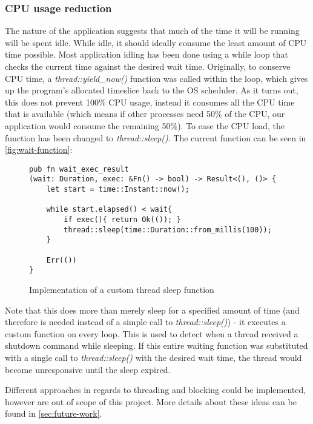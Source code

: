         \subsubsection{CPU usage reduction}
             The nature of the application suggests that much of the time it will be running will be spent idle. While idle, it should ideally consume the least amount of CPU time possible. Most application idling has been done using a while loop that checks the current time against the desired wait time. Originally, to conserve CPU time, a \textit{thread::yield\_now()} function was called within the loop, which gives up the program's allocated timeslice back to the OS scheduler. As it turns out, this does not prevent 100\% CPU usage, instead it consumes all the CPU time that is available (which means if other processes need 50\% of the CPU, our application would consume the remaining 50\%). To ease the CPU load, the function has been changed to \textit{thread::sleep()}. The current function can be seen in \autoref{fig:wait-function}:
             
             \begin{figure}[!htb]
                \centering
                \begin{BVerbatim}
pub fn wait_exec_result
(wait: Duration, exec: &Fn() -> bool) -> Result<(), ()> {
    let start = time::Instant::now();

    while start.elapsed() < wait{
        if exec(){ return Ok(()); }
        thread::sleep(time::Duration::from_millis(100));
    }
    
    Err(())
}
                \end{BVerbatim}
                \caption{Implementation of a custom thread sleep function}
                \label{fig:wait-function}
            \end{figure}
            
            Note that this does more than merely sleep for a specified amount of time (and therefore is needed instead of a simple call to \textit{thread::sleep()}) - it executes a custom function on every loop. This is used to detect when a thread received a shutdown command while sleeping. If this entire waiting function was substituted with a single call to \textit{thread::sleep()} with the desired wait time, the thread would become unresponsive until the sleep expired.

            Different approaches in regards to threading and blocking could be implemented, however are out of scope of this project. More details about these ideas can be found in \autoref{sec:future-work}.

